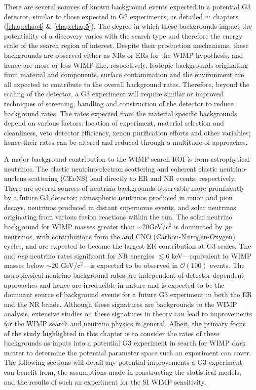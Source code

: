 There are several sources of known background events expected in a potential G3 detector, similar to those expected in G2 experiments, as detailed in chapters (\ref{chap:chap4} \& \ref{chap:chap5}). The degree in which these backgrounds impact the potentiality of a discovery varies with the search type and therefore the energy scale of the search region of interest. Despite their production mechanisms, these backgrounds are observed either as NRs or ERs for the WIMP hypothesis, and hence are more or less WIMP-like, respectively. Isotopic backgrounds originating from material and components, surface contamination and the environment are all expected to contribute to the overall background rates. Therefore, beyond the scaling of the detector, a G3 experiment will require similar or improved techniques of screening, handling and construction of the detector to reduce background rates. The rates expected from the material specific backgrounds depend on various factors: location of experiment, material selection and cleanliness, veto detector efficiency, xenon purification efforts and other variables; hence their rates can be altered and reduced through a multitude of approaches.

A major background contribution to the WIMP search ROI is from astrophysical neutrinos. The elastic neutrino-electron scattering \cite{HASERT1973138} and coherent elastic neutrino-nucleus scattering (CE$\nu$NS) \cite{Akimov_2017} lead directly to ER and NR events, respectively. There are several sources of neutrino backgrounds observable more prominently by a future G3 detector; atmospheric neutrinos produced in muon and pion decays, neutrinos produced in distant supernovae events, and solar neutrinos originating from various fusion reactions within the sun. The solar neutrino background for WIMP masses greater than $\sim$20GeV/c$^{2}$ is dominated by \textit{pp} neutrinos, with contributions from the \BeS{} and CNO (Carbon-Nitrogen-Oxygen) cycles, and are expected to become the largest ER contribution at G3 scales. The \BE{} and \textit{hep} neutrino rates significant for NR energies $\lesssim 6$ keV---equivalent to WIMP masses below $\sim20$ GeV/c$^{2}$---is expected to be observed in $\mathcal{O}(100)$ events. The astrophysical neutrino background rates are independent of detector dependent approaches and hence are irreducible in nature and is expected to be the dominant source of background events for a future G3 experiment in both the ER and the NR bands. Although these signatures are backgrounds to the WIMP analysis, extensive studies on these signatures in theory can lead to improvements for the WIMP search and neutrino physics in general. Albeit, the primary focus of the study highlighted in this chapter is to consider the rates of these backgrounds as inputs into a potential G3 experiment in search for WIMP dark matter to determine the potential parameter space such an experiment can cover. The following sections will detail any potential improvements a G3 experiment can benefit from, the assumptions made in constructing the statistical models, and the results of such an experiment for the SI WIMP sensitivity. 


